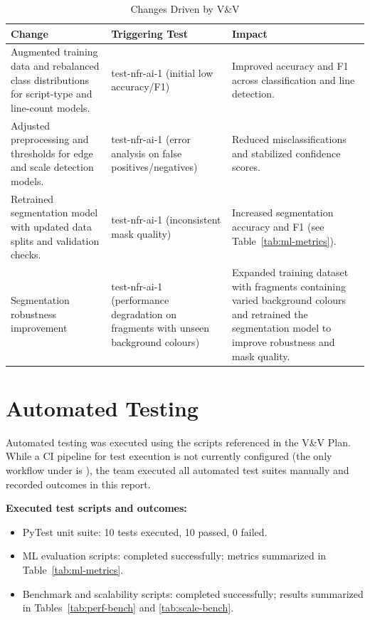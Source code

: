 \documentclass[12pt, titlepage]{article}
\begin{document}
\begin{table}[H]
\centering
\caption{Changes Driven by V\&V}
\begin{tabularx}{\textwidth}{p{4.6cm}p{4.2cm}p{4.2cm}}
\toprule
\textbf{Change} & \textbf{Triggering Test} & \textbf{Impact}\\
\midrule
Augmented training data and rebalanced class distributions for script-type and line-count models. & 
test-nfr-ai-1 (initial low accuracy/F1) & 
Improved accuracy and F1 across classification and line detection.\\

Adjusted preprocessing and thresholds for edge and scale detection models. & 
test-nfr-ai-1 (error analysis on false positives/negatives) & 
Reduced misclassifications and stabilized confidence scores.\\

Retrained segmentation model with updated data splits and validation checks. & 
test-nfr-ai-1 (inconsistent mask quality) & 
Increased segmentation accuracy and F1 (see Table~\ref{tab:ml-metrics}).\\

Segmentation robustness improvement &
test-nfr-ai-1 (performance degradation on fragments with unseen background colours) &
Expanded training dataset with fragments containing varied background colours and retrained the segmentation model to improve robustness and mask quality.\\

\bottomrule
\end{tabularx}
\end{table}

\section{Automated Testing}

Automated testing was executed using the scripts referenced in the V\&V Plan. While a CI pipeline for test execution is not currently configured (the only workflow under  is ), the team executed all automated test suites manually and recorded outcomes in this report.

\textbf{Executed test scripts and outcomes:}
\begin{itemize}
  \item PyTest unit suite: 10 tests executed, 10 passed, 0 failed.
  \item ML evaluation scripts: completed successfully; metrics summarized in Table~\ref{tab:ml-metrics}.
  \item Benchmark and scalability scripts: completed successfully; results summarized in Tables~\ref{tab:perf-bench} and \ref{tab:scale-bench}.
\end{itemize}
\end{document}
